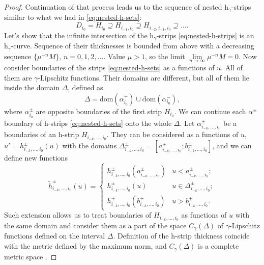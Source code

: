 \begin{proof}
	Continuation of that process leads us to the sequence of nested $\mathrm{h}_{\gamma}$-strips similar to what we had in \eqref{eq:nested-h-sets}:
	\begin{equation}
		D_{i_0} = H_{i_0} \supseteq H_{i_{-1}, i_0} \supseteq H_{i_{-2}, i_{-1}, i_0} \supseteq \dots.
	\label{eq:nested-h-strips}
	\end{equation}
	Let's show that the infinite intersection of the $\mathrm{h}_{\gamma}$-strips \eqref{eq:nested-h-strips} is an $\mathrm{h}_{\gamma}$-curve.
	Sequence of their thicknesses is bounded from above with a decreasing sequence $\{ \mu^{-n} M \}$, $n = 0, 1, 2, \dots$.
	Value $\mu > 1$, so the limit $\lim \limits_{n \to \infty} \mu^{-n} M = 0$.	
	Now consider boundaries of the strips \eqref{eq:nested-h-sets} as a functions of $u$.
	All of them are $\gamma$-Lipschitz functions.
	Their domains are different, but all of them lie inside the domain $\Delta$, defined as
	\begin{equation}
		\Delta = \mathrm{dom}(\alpha_{i_0}^+) \cup \mathrm{dom}(\alpha_{i_0}^-),
	\end{equation}
	where $\alpha_{i_0}^{\pm}$ are opposite boundaries of the first strip $H_{i_0}$.
	We can continue each $\alpha^{\pm}$ boundary of h-strips \eqref{eq:nested-h-sets} onto the whole $\Delta$.
	Let $\alpha_{i_{-k}, \dots, i_0}^{\pm}$ be a boundaries of an h-strip $H_{i_{-k}, \dots, i_0}$.
	They can be considered as a functions of $u$, $u' = h_{i_{-k}, \dots, i_0}^{\pm}(u)$ with the domains $\Delta_{i_{-k}, \dots, i_0}^{\pm} = [a_{i_{-k}, \dots, i_0}^{\pm}; b_{i_{-k}, \dots, i_0}^{\pm}]$, and we can define new functions
	\begin{equation}
		\widetilde{h}_{i_{-k}, \dots, i_0}^{\pm}(u) = \begin{cases}
			h_{i_{-k}, \dots, i_0}^{\pm}(a_{i_{-k}, \dots, i_0}^{\pm}) & u < a_{i_{-k}, \dots, i_0}^{\pm}; \\
			h_{i_{-k}, \dots, i_0}^{\pm}(u) & u \in \Delta_{i_{-k}, \dots, i_0}^{\pm}; \\
			h_{i_{-k}, \dots, i_0}^{\pm}(b_{i_{-k}, \dots, i_0}^{\pm}) & u > b_{i_{-k}, \dots, i_0}^{\pm}.
		\end{cases}
	\label{eq:nested-h-strips-extension}
	\end{equation}
	Such extension allows us to treat boundaries of $H_{{i_{-k}, \dots, i_0}}$ as functions of $u$ with the same domain and consider them as a part of the space $C_{\gamma}(\Delta)$ of $\gamma$-Lipschitz functions defined on the interval $\Delta$.
	Definition of the h-strip thickness coincide with the metric defined by the maximum norm, and $C_{\gamma}(\Delta)$ is a complete metric space \cite{Arnold}.

\end{proof}
